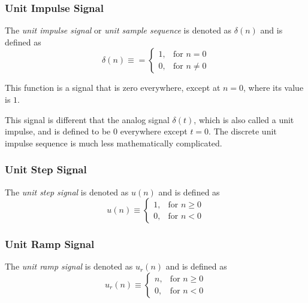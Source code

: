 \subsubsection{Unit Impulse Signal}\label{subsubsec:Unit Impulse Signal}
\begin{definition}\label{def:Unit Impulse Signal}
  The \emph{unit impulse signal} or \emph{unit sample sequence} is denoted as $\delta(n)$ and is defined as
  \begin{equation}\label{eq:Unit Impulse Signal}
    \delta(n) \equiv = \begin{cases}
      1, & \text{for } n = 0 \\
      0, & \text{for } n \neq 0
    \end{cases}
  \end{equation}

  This function is a signal that is zero everywhere, except at $n=0$, where its value is $1$.

  \begin{remark}
    This signal is different that the analog signal $\delta (t)$, which is also called a unit impulse, and is defined to be 0 everywhere except $t=0$.
    The discrete unit impulse sequence is much less mathematically complicated.
  \end{remark}
\end{definition}

\subsubsection{Unit Step Signal}\label{subsubsec:Unit Step Signal}
\begin{definition}\label{def:Unit Step Signal}
  The \emph{unit step signal} is denoted as $u(n)$ and is defined as
  \begin{equation}\label{eq:Unit Step Signal}
    u(n) \equiv \begin{cases}
      1, & \text{for } n \geq 0 \\
      0, & \text{for } n < 0
    \end{cases}
  \end{equation}
\end{definition}

\subsubsection{Unit Ramp Signal}\label{subsubsec:Unit Ramp Signal}
\begin{definition}\label{def:Unit Ramp Signal}
  The \emph{unit ramp signal} is denoted as $u_{r}(n)$ and is defined as
  \begin{equation}\label{eq:Unit Ramp Signal}
    u_{r}(n) \equiv \begin{cases}
      n, & \text{for } n \geq 0 \\
      0, & \text{for } n < 0
    \end{cases}
  \end{equation}
\end{definition}

